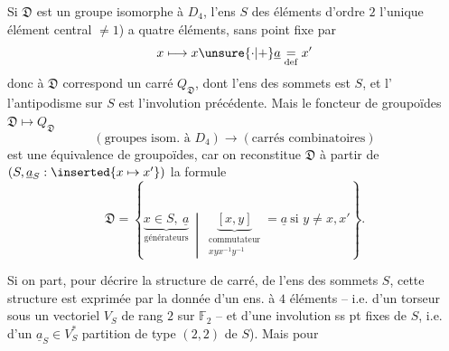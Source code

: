 Si $\mathfrak{D}$ est un groupe isomorphe à $D_4$, l'ens $S$ des éléments d'ordre $2$  l'unique élément central $\ne1$)  a quatre éléments,   sans point  fixe par
\[
x\longmapsto x\unsure{\cdot|+}\underline{a}\underset{\mathrm{def}}{=}x'
\]
donc à $\mathfrak{D}$ correspond un carré $Q_{\mathfrak{D}}$, dont l'ens des sommets est $S$, et l' l'antipodisme sur $S$ est l'involution précédente.
Mais le foncteur de groupoïdes $\mathfrak{D}\mapsto Q_{\mathfrak{D}}$
\[
(\text{groupes isom. à }D_4)\longrightarrow(\text{carrés combinatoires})
\]
est une équivalence de groupoïdes, car on reconstitue $\mathfrak{D}$ à partir de $(S,\underline{a}_S:\inserted{x\mapsto x'})$  la formule
\[
\mathfrak{D}=\left\{
\underbrace{x\in S,\ \underline{a}}_{\text{générateurs}}\ \middle|\
\underbrace{[x,y]}_{\substack{\text{commutateur}\\xyx^{-1}y^{-1}}}
=\underline{a}\ \text{si }y\ne x,x'
\right\}.
\]

Si on part, pour décrire la structure de carré, de l'ens des sommets $S$, cette structure est exprimée par la donnée d'un ens.  à $4$ éléments -- i.e. d'un torseur sous un vectoriel $V_S$ de rang $2$ sur $\mathbb{F}_2$ -- et d'une  involution ss pt fixes de $S$, i.e. d'un $\underline{a}_S\in V_S^*$   partition de type $(2,2)$ de $S$). Mais pour

